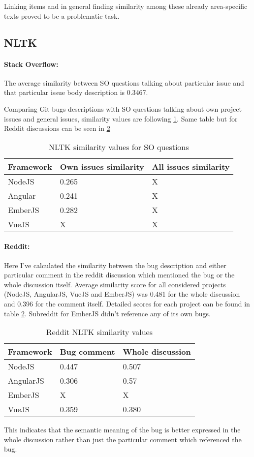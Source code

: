 Linking items and in general finding similarity among these already area-specific texts proved to be a problematic task. 

\subsection{NLTK}
\paragraph{Stack Overflow:}
The average similarity between SO questions talking about particular issue and that particular issue body description is 0.3467.


Comparing Git bugs descriptions with SO questions talking about own project issues and general issues, similarity values are following \ref{table:StackOverflowNLTKsimilarity}. Same table but for Reddit discussions can be seen in \ref{table:RedditNLTKsimilarity}

\begin{table}[H]
\centering
\begin{tabular}{ |p{3cm}||p{5cm}|p{5cm}|}
 \hline
\textbf{ Framework }& \textbf{Own issues similarity}& \textbf{All issues similarity}\\
 \hline
 NodeJS   & 0.265 & X\\ \hline
 Angular & 0.241 & X\\ \hline
 EmberJS & 0.282 & X\\ \hline 
 VueJS &   X & X\\ \hline
\end{tabular}
\caption{NLTK similarity values for SO questions}
\label{table:StackOverflowNLTKsimilarity}
\end{table}

\paragraph{Reddit:}
Here I've calculated the similarity between the bug description and either particular comment in the reddit discussion which mentioned the bug or the whole discussion itself. Average similarity score for all considered projects (NodeJS, AngularJS, VueJS and EmberJS) was 0.481 for the whole discussion and 0.396 for the comment itself. Detailed scores for each project can be found in table \ref{table:RedditNLTKsimilarity}. Subreddit for EmberJS didn't reference any of its own bugs.

\begin{table}[H]
\centering
\begin{tabular}{ |p{3cm}||p{3cm}|p{4cm}|}
 \hline
\textbf{ Framework }& \textbf{Bug comment}& \textbf{Whole discussion}\\
 \hline
 NodeJS   & 0.447 & 0.507\\ \hline 
 AngularJS & 0.306 & 0.57 \\ \hline 
 EmberJS & X & X\\ \hline
 VueJS &   0.359 & 0.380\\ \hline
\end{tabular}
\caption{Reddit NLTK similarity values}
\label{table:RedditNLTKsimilarity}
\end{table}

This indicates that the semantic meaning of the bug is better expressed in the whole discussion rather than just the particular comment which referenced the bug.


